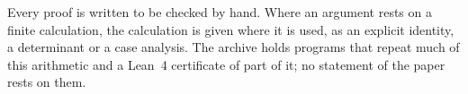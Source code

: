 Every proof is written to be checked by hand. Where an argument rests on a
finite calculation, the calculation is given where it is used, as an explicit
identity, a determinant or a case analysis. The archive \cite{BMB26} holds
programs that repeat much of this arithmetic and a Lean~4 certificate of
part of it; no statement of the paper rests on them.
